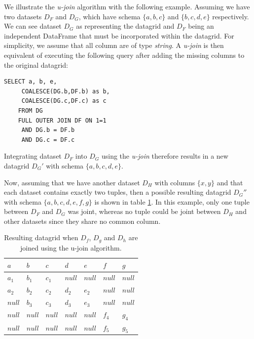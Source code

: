 \documentclass[10pt, a4paper, twocolumn]{article} %
\begin{document}
We illustrate the \textit{u-join} algorithm with the following example. Assuming we have two datasets $D_F$ and $D_G$, which have schema $\{a,b,c\}$ and $\{b,c,d,e\}$ respectively. We can see dataset $D_G$ as representing the datagrid and $D_F$ being an independent DataFrame that must be incorporated within the datagrid.
For simplicity, we assume that all column are of type \textit{string}.     
A \textit{u-join} is then equivalent of executing the following query after adding the missing columns to the original datagrid:

\begin{lstlisting}[numbers=none]
    SELECT a, b, e, 
     COALESCE(DG.b,DF.b) as b, 
     COALESCE(DG.c,DF.c) as c
    FROM DG
    FULL OUTER JOIN DF ON 1=1
     AND DG.b = DF.b
     AND DG.c = DF.c
\end{lstlisting}

Integrating dataset $D_F$ into $D_G$ using the \textit{u-join} therefore results in a new datagrid $D_G'$ with schema $\{a,b,c,d,e\}$.

Now, assuming that we have another dataset $D_H$ with columns $\{x,y\}$ and that each dataset contains exactly two tuples, then a possible resulting datagrid $D_G''$ with schema $\{a,b,c,d,e,f,g\}$ is shown in table \ref{table:datagrid}. In this example, only one tuple between $D_F$ and $D_G$ was joint, whereas no tuple could be joint between $D_H$ and other datasets since they share no common column.

\begin{table}[H]
	\centering
	\begin{tabular}{lllllll}
	\toprule
	$a$ & $b$ & $c$ & $d$ & $e$ & $f$ & $g$ \\
	\midrule
	$a_1$ & $b_1$ & $c_1$ & $null$ & $null$ & $null$ & $null$ \\
	$a_2$ & $b_2$ & $c_2$ & $d_2$ &  $e_2$  & $null$ & $null$ \\
	$null$ & $b_3$ & $c_3$ & $d_3$ &  $e_3$  & $null$ & $null$ \\
	$null$ & $null$ & $null$ & $null$ &  $null$  & $f_4$ & $g_4$ \\
	$null$ & $null$ & $null$ & $null$ &  $null$  & $f_5$ & $g_5$ \\
	\bottomrule
	\end{tabular}
	\caption{Resulting datagrid when $D_f$, $D_g$ and $D_h$ are joined using the u-join algorithm.}
	\label{table:datagrid}
\end{table}
\end{document}
